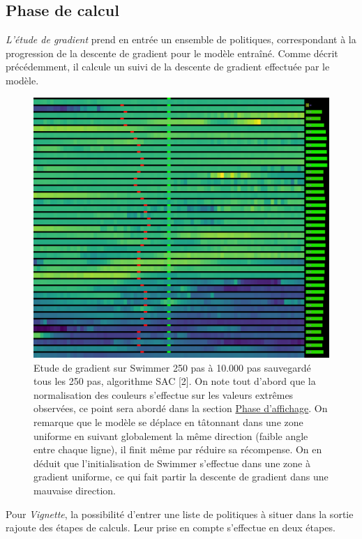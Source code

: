 \documentclass[12pt]{article}
\begin{document}
\subsection{Phase de calcul}

\emph{L'étude de gradient} prend en entrée un ensemble de politiques, correspondant à la progression de la descente de gradient pour le modèle entraîné. Comme décrit précédemment, il calcule un suivi de la descente de gradient effectuée par le modèle. \\

\begin{figure}[htp]
    \centering
    \includegraphics[width=15cm]{Images/gradientStudy_swimmer}
    \caption{Etude de gradient sur Swimmer 250 pas à 10.000 pas sauvegardé tous les 250 pas, algorithme SAC [2]. On note tout d'abord que la normalisation des couleurs s'effectue sur les valeurs extrêmes observées, ce point sera abordé dans la section \hyperref[sec:affichage]{Phase d'affichage}. On remarque que le modèle se déplace en tâtonnant dans une zone uniforme en suivant globalement la même direction (faible angle entre chaque ligne), il finit même par réduire sa récompense. On en déduit que l'initialisation de Swimmer s'effectue dans une zone à gradient uniforme, ce qui fait partir la descente de gradient dans une mauvaise direction.}
    \label{fig:gradientStudy}
\end{figure}

Pour \emph{Vignette}, la possibilité d'entrer une liste de politiques à situer dans la sortie rajoute des étapes de calculs. Leur prise en compte s'effectue en deux étapes. \\
\end{document}
